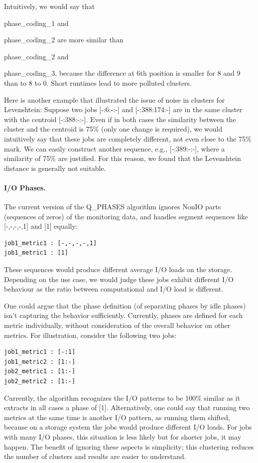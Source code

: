 \documentclass{jhps}
\begin{document}
Intuitively, we would say that {phase\_coding\_1 and{ phase\_coding\_2 are more similar than {phase\_coding\_2 and {phase\_coding\_3, because the difference at 6th position is smaller for 8 and 9 than to 8 to 0.
Short runtimes lead to more polluted clusters.

Here is another example that illustrated the issue of noise in clusters for Levenshtein:
Suppose two jobs [-:6:-:-] and [-:388:174:-] are in the same cluster with the centroid [-:388:-:-].
Even if in both cases the similarity between the cluster and the centroid is 75$\%$  (only one change is required), we would intuitively say that these jobs are completely different, not even close to the 75$\%$  mark.
We can easily construct another sequence, e.g., [-:389:-:-], where a similarity of 75$\%$  are justified.
For this reason, we found that the Levenshtein distance is generally not suitable.

\paragraph{I/O Phases.}
The current version of the Q\_PHASES algorithm ignores NonIO parts (sequences of zeros) of the monitoring data, and handles segment sequences like [-,-,-,-,1] and [1] equally:
\begin{lstlisting}
job1_metric1 : [-,-,-,-,1]
job1_metric1 : [1]
\end{lstlisting}

These sequences would produce different average I/O loads on the storage.
Depending on the use case, we would judge these jobs exhibit different I/O behaviour as the ratio between computational and I/O load is different.

One could argue that the phase definition (of separating phases by idle phases) isn't capturing the behavior sufficiently.
Currently, phases are defined for each metric individually, without consideration of the overall behavior on  other metrics.
For illustration, consider the following two jobs:
\begin{lstlisting}
job1_metric1 : [-:1]
job1_metric2 : [1:-]
job2_metric1 : [1:-]
job2_metric2 : [1:-]
\end{lstlisting}

Currently, the algorithm recognizes the I/O patterns to be 100$\%$ similar as it extracts in all cases a phase of [1].
Alternatively, one could say that running two metrics at the same time is another I/O pattern, as running them shifted, because on a storage system the jobs would produce different I/O loads.
For jobs with many I/O phases, this situation is less likely but for shorter jobs, it may happen.
The benefit of ignoring these aspects is simplicity; this clustering reduces the number of clusters and  results are easier to understand.

}}}}
\end{document}
